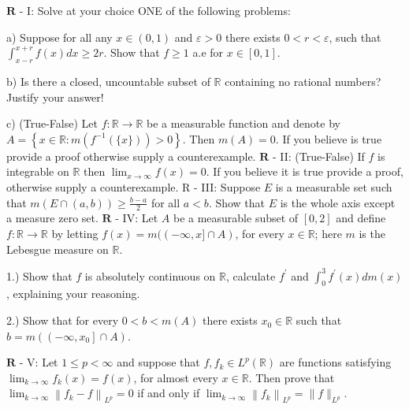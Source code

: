 \documentclass[14pt]{extarticle}
\begin{document}
$\mathbf{R}$ - I: Solve at your choice ONE of the following problems:

a) Suppose for all any $x \in(0,1)$ and $\varepsilon>0$ there exists $0<r<\varepsilon$, such that $\int_{x-r}^{x+r} f(x) d x \geq 2 r$. Show that $f \geq 1$ a.e for $x \in[0,1]$.

b) Is there a closed, uncountable subset of $\mathbb{R}$ containing no rational numbers? Justify your answer!

c) (True-False) Let $f: \mathbb{R} \rightarrow \mathbb{R}$ be a measurable function and denote by $A=\left\{x \in \mathbb{R}: m\left(f^{-1}(\{x\})\right)>0\right\}$. Then $m(A)=0$. If you believe is true provide a proof otherwise supply a counterexample.
\newpage
$\mathbf{R}$ - II: (True-False) If $f$ is integrable on $\mathbb{R}$ then $\lim _{x \rightarrow \infty} f(x)=0$. If you believe it is true provide a proof, otherwise supply a counterexample.
\newpage
R - III: Suppose $E$ is a measurable set such that $m(E \cap(a, b)) \geq \frac{b-a}{2}$ for all $a<b$. Show that $E$ is the whole axis except a measure zero set.
\newpage
$\mathbf{R}$ - IV: Let $A$ be a measurable subset of $[0,2]$ and define $f: \mathbb{R} \rightarrow \mathbb{R}$ by letting $f(x)=m((-\infty, x] \cap A)$, for every $x \in \mathbb{R}$; here $m$ is the Lebesgue measure on $\mathbb{R}$.

1.) Show that $f$ is absolutely continuous on $\mathbb{R}$, calculate $f^{\prime}$ and $\int_{0}^{3} f^{\prime}(x) d m(x)$, explaining your reasoning.

2.) Show that for every $0<b<m(A)$ there exists $x_{0} \in \mathbb{R}$ such that $b=m\left(\left(-\infty, x_{0}\right] \cap A\right)$.


\newpage
$\mathbf{R}$ - V: Let $1 \leq p<\infty$ and suppose that $f, f_{k} \in L^{p}(\mathbb{R})$ are functions satisfying $\lim _{k \rightarrow \infty} f_{k}(x)=f(x)$, for almost every $x \in \mathbb{R}$. Then prove that $\lim _{k \rightarrow \infty}\left\|f_{k}-f\right\|_{L^{p}}=0$ if and only if $\lim _{k \rightarrow \infty}\left\|f_{k}\right\|_{L^{p}}=\|f\|_{L^{p}}$.
\end{document}
